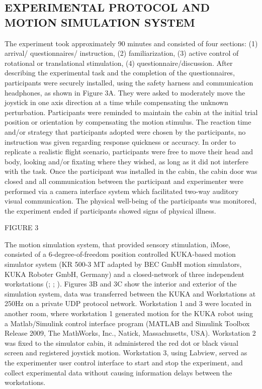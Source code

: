 \documentclass[11pt, onecolumn]{article}
\begin{document}
\subsection{EXPERIMENTAL PROTOCOL AND MOTION SIMULATION SYSTEM}
The experiment took approximately 90 minutes and consisted of four sections: (1) arrival/ questionnaires/ instruction, (2) familiarization, (3) active control of rotational or translational stimulation, (4) questionnaire/discussion.  After describing the experimental task and the completion of the questionnaires, participants were securely installed, using the safety harness and communication headphones, as shown in Figure 3A. They were asked to moderately move the joystick in one axis direction at a time while compensating the unknown perturbation.  Participants were reminded to maintain the cabin at the initial trial position or orientation by compensating the motion stimulus.  The reaction time and/or strategy that participants adopted were chosen by the participants, no instruction was given regarding response quickness or accuracy.  In order to replicate a realistic flight scenario, participants were free to move their head and body, looking and/or fixating where they wished, as long as it did not interfere with the task.  Once the participant was installed in the cabin, the cabin door was closed and all communication between the participant and experimenter were performed via a camera interface system which facilitated two-way auditory visual communication. The physical well-being of the participants was monitored, the experiment ended if participants showed signs of physical illness.

FIGURE 3

The motion simulation system, that provided sensory stimulation, iMose, consisted of a 6-degree-of-freedom position controlled KUKA-based motion simulator system (KR 500-3 MT adapted by BEC GmbH motion simulators, KUKA Roboter GmbH, Germany) and a closed-network of three independent workstations (\cite{Denquin_2021_LAF}; \cite{Landrieu_2017_Timetocollision}; \cite{Bellmann_2011_DLR}).  Figures 3B and 3C show the interior and exterior of the simulation system, data was transferred between the KUKA and Workstations at 250Hz on a private UDP protocol network.  Workstation 1 and 3 were located in another room, where workstation 1 generated motion for the KUKA robot using a Matlab/Simulink control interface program (MATLAB and Simulink Toolbox Release 2009, The MathWorks, Inc., Natick, Massachusetts, USA).  Workstation 2 was fixed to the simulator cabin, it administered the red dot or black visual screen and registered joystick motion.  Workstation 3, using Labview, served as the experimenter user control interface to start and stop the experiment, and collect experimental data without causing information delays between the workstations.
\end{document}
